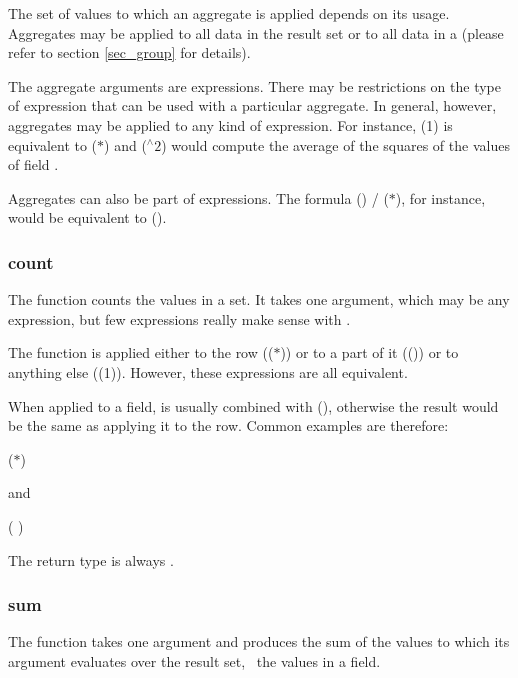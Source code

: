 The set of values to which an aggregate is applied
depends on its usage. Aggregates may be applied
to all data in the result set or to all data
in a  (please refer to section \ref{sec_group}
for details).

The aggregate arguments are expressions.
There may be restrictions
on the type of expression that can be used
with a particular aggregate.
In general, however, aggregates may
be applied to any kind of expression.
For instance,
(1) is equivalent to
($\ast$) and
($^{\wedge}2$) would compute
the average of the squares of the values
of field .

Aggregates can also be part of expressions.
The formula 
()
/ ($\ast$),
for instance, would be equivalent to
().

\subsubsection{count}
The function counts the values in a set.
It takes one argument, which may be any expression,
but few expressions really make sense with .

The function is applied either to the row (($\ast$))
or to a part of it (())
or to anything else ((1)).
However, these expressions are all equivalent.
 
When applied to a field,  is usually combined with
 (),
otherwise the result would be the same as applying it to the row.
Common examples are therefore:

 ($\ast$)  

and

 ( )
 

The return type is always .

\subsubsection{sum}
The function takes one argument and
produces the sum of the values
to which its argument evaluates over the result set,
\eg\ the values in a field.

